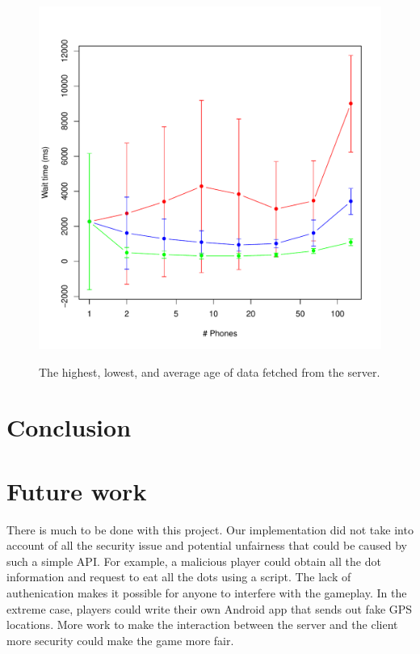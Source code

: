 \documentclass{acm_proc_article-sp}
\begin{document}
\begin{figure}
\centering
\includegraphics[scale=0.5]{figs/serverQueueLatency}
\label{fig:serverQueueLatency}
\caption{The highest, lowest, and average age of data fetched from the server.}
\end{figure}

\section{Conclusion}

\section{Future work}

There is much to be done with this project. Our implementation did not
take into account of all the security issue and potential unfairness
that could be caused by such a simple API. For example, a malicious
player could obtain all the dot information and request to eat all the
dots using a script. The lack of authenication makes it possible for
anyone to interfere with the gameplay. In the extreme case, players
could write their own Android app that sends out fake GPS
locations. More work to make the interaction between the server and
the client more security could make the game more fair.
\end{document}

